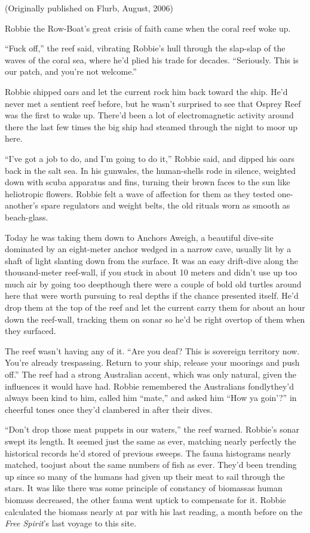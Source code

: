 \textsf{(Originally published on Flurb, August, 2006)}

Robbie the Row-Boat’s great crisis of faith came when the coral
reef woke up.

“Fuck off,” the reef said, vibrating Robbie’s hull through the
slap-slap of the waves of the coral sea, where he’d plied his trade
for decades. “Seriously. This is our patch, and you’re not
welcome.”

Robbie shipped oars and let the current rock him back toward the
ship. He’d never met a sentient reef before, but he wasn’t
surprised to see that Osprey Reef was the first to wake up. There’d
been a lot of electromagnetic activity around there the last few
times the big ship had steamed through the night to moor up here.

“I’ve got a job to do, and I’m going to do it,” Robbie said, and
dipped his oars back in the salt sea. In his gunwales, the
human-shells rode in silence, weighted down with scuba apparatus
and fins, turning their brown faces to the sun like heliotropic
flowers. Robbie felt a wave of affection for them as they tested
one-another’s spare regulators and weight belts, the old rituals
worn as smooth as beach-glass.

Today he was taking them down to Anchors Aweigh, a beautiful
dive-site dominated by an eight-meter anchor wedged in a narrow
cave, usually lit by a shaft of light slanting down from the
surface. It was an easy drift-dive along the thousand-meter
reef-wall, if you stuck in about 10 meters and didn’t use up too
much air by going too deep\dash{}though there were a couple of bold old
turtles around here that were worth pursuing to real depths if the
chance presented itself. He’d drop them at the top of the reef and
let the current carry them for about an hour down the reef-wall,
tracking them on sonar so he’d be right overtop of them when they
surfaced.

The reef wasn’t having any of it. “Are you deaf? This is sovereign
territory now. You’re already trespassing. Return to your ship,
release your moorings and push off.” The reef had a strong
Australian accent, which was only natural, given the influences it
would have had. Robbie remembered the Australians fondly\dash{}they’d
always been kind to him, called him “mate,” and asked him “How ya
goin’?” in cheerful tones once they’d clambered in after their
dives.

“Don’t drop those meat puppets in our waters,” the reef warned.
Robbie’s sonar swept its length. It seemed just the same as ever,
matching nearly perfectly the historical records he’d stored of
previous sweeps. The fauna histograms nearly matched, too\dash{}just
about the same numbers of fish as ever. They’d been trending up
since so many of the humans had given up their meat to sail through
the stars. It was like there was some principle of constancy of
biomass\dash{}as human biomass decreased, the other fauna went uptick to
compensate for it. Robbie calculated the biomass nearly at par with
his last reading, a month before on the \emph{Free Spirit}’s last
voyage to this site.

